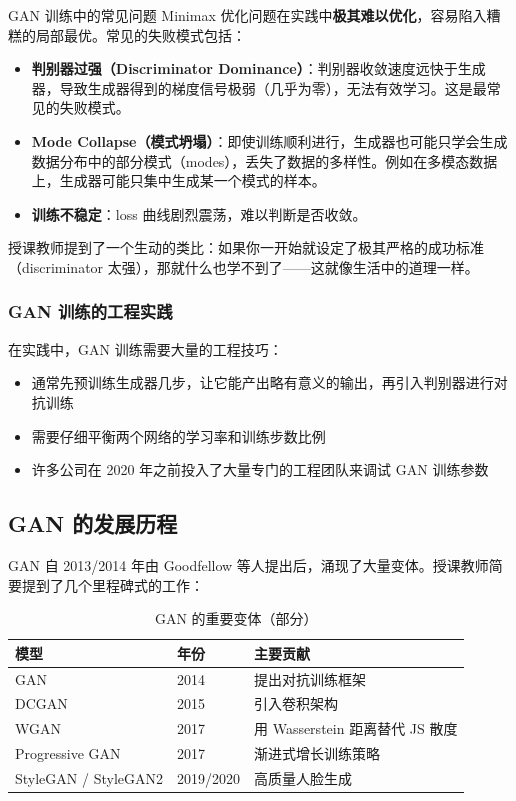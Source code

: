 \documentclass[a4paper]{article}
\begin{document}
\begin{warningbox}{GAN 训练中的常见问题}
Minimax 优化问题在实践中\textbf{极其难以优化}，容易陷入糟糕的局部最优。常见的失败模式包括：
\begin{itemize}
    \item \textbf{判别器过强（Discriminator Dominance）}：判别器收敛速度远快于生成器，导致生成器得到的梯度信号极弱（几乎为零），无法有效学习。这是最常见的失败模式。
    \item \textbf{Mode Collapse（模式坍塌）}：即使训练顺利进行，生成器也可能只学会生成数据分布中的部分模式（modes），丢失了数据的多样性。例如在多模态数据上，生成器可能只集中生成某一个模式的样本。
    \item \textbf{训练不稳定}：loss 曲线剧烈震荡，难以判断是否收敛。
\end{itemize}
\end{warningbox}

授课教师提到了一个生动的类比：如果你一开始就设定了极其严格的成功标准（discriminator 太强），那就什么也学不到了——这就像生活中的道理一样。

\subsubsection{GAN 训练的工程实践}

在实践中，GAN 训练需要大量的工程技巧：

\begin{itemize}
    \item 通常先预训练生成器几步，让它能产出略有意义的输出，再引入判别器进行对抗训练
    \item 需要仔细平衡两个网络的学习率和训练步数比例
    \item 许多公司在 2020 年之前投入了大量专门的工程团队来调试 GAN 训练参数
\end{itemize}

\subsection{GAN 的发展历程}

GAN 自 2013/2014 年由 Goodfellow 等人提出后，涌现了大量变体。授课教师简要提到了几个里程碑式的工作：

\begin{table}[H]
\centering
\begin{tabular}{lll}
\toprule
模型 & 年份 & 主要贡献 \\
\midrule
GAN & 2014 & 提出对抗训练框架 \\
DCGAN & 2015 & 引入卷积架构 \\
WGAN & 2017 & 用 Wasserstein 距离替代 JS 散度 \\
Progressive GAN & 2017 & 渐进式增长训练策略 \\
StyleGAN / StyleGAN2 & 2019/2020 & 高质量人脸生成 \\
\bottomrule
\end{tabular}
\caption{GAN 的重要变体（部分）}
\end{table}
\end{document}
